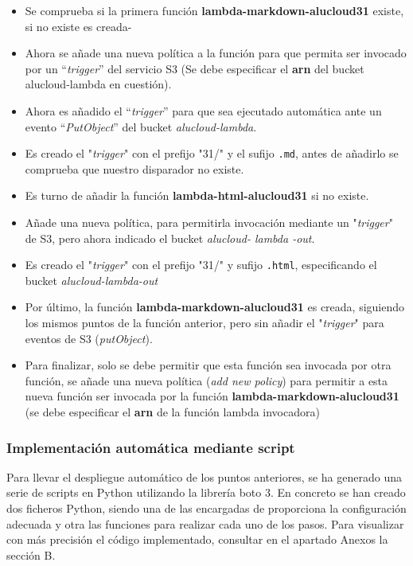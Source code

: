 \documentclass[
]{article}
\begin{document}
\begin{itemize}
\item
  Se comprueba si la primera función \textbf{lambda-markdown-alucloud31}
  existe, si no existe es creada-
\item
  Ahora se añade una nueva política a la función para que permita ser
  invocado por un ``\emph{trigger}'' del servicio S3 (Se debe
  especificar el \textbf{arn} del bucket alucloud-lambda en cuestión).
\item
  Ahora es añadido el ``\emph{trigger}'' para que sea ejecutado
  automática ante un evento ``\emph{PutObject}'' del bucket
  \emph{alucloud-lambda}.
\item
  Es creado el "\emph{trigger}" con el prefijo "31/" y el sufijo
  \texttt{.md}, antes de añadirlo se comprueba que nuestro disparador no
  existe.
\item
  Es turno de añadir la función \textbf{lambda-html-alucloud31} si no
  existe.
\item
  Añade una nueva política, para permitirla invocación mediante un
  "\emph{trigger}" de S3, pero ahora indicado el bucket \emph{alucloud-
  lambda -out}.
\item
  Es creado el "\emph{trigger}" con el prefijo "31/" y sufijo
  \texttt{.html}, especificando el bucket \emph{alucloud-lambda-out}
\item
  Por último, la función \textbf{lambda-markdown-alucloud31} es creada,
  siguiendo los mismos puntos de la función anterior, pero sin añadir el
  "\emph{trigger}" para eventos de S3 (\emph{putObject}).
\item
  Para finalizar, solo se debe permitir que esta función sea invocada
  por otra función, se añade una nueva política (\emph{add new policy})
  para permitir a esta nueva función ser invocada por la función
  \textbf{lambda-markdown-alucloud31} (se debe especificar el
  \textbf{arn} de la función lambda invocadora)
\end{itemize}
\leavevmode
\newline
\hypertarget{header-n144}{%
\subsubsection{Implementación automática mediante
script}\label{header-n144}}
\leavevmode
\newline
Para llevar el despliegue automático de los puntos anteriores, se ha
generado una serie de scripts en Python utilizando la librería boto 3.
En concreto se han creado dos ficheros Python, siendo una de las
encargadas de proporciona la configuración adecuada y otra las funciones
para realizar cada uno de los pasos. Para visualizar con más precisión
el código implementado, consultar en el apartado Anexos la sección B.
\end{document}
